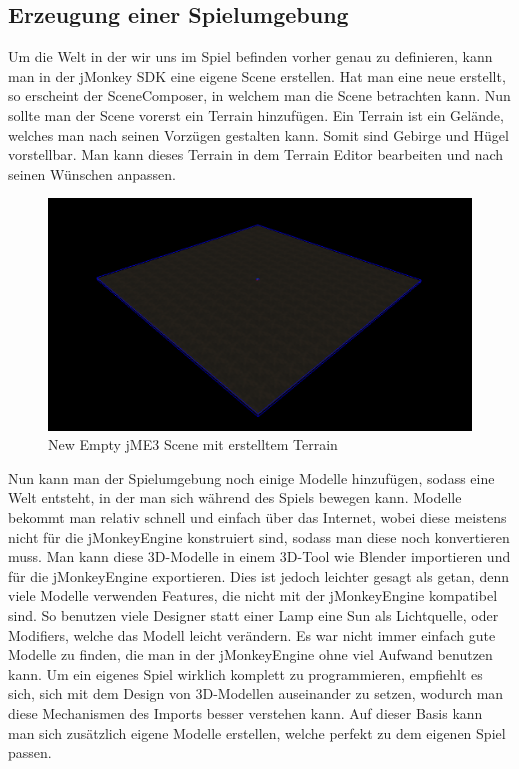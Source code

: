 \subsection{Erzeugung einer Spielumgebung}
Um die Welt in der wir uns im Spiel befinden vorher genau zu definieren, kann man in der jMonkey SDK eine eigene Scene erstellen. Hat man eine neue  erstellt, so erscheint der SceneComposer, in welchem man die Scene betrachten kann. Nun sollte man der Scene vorerst ein Terrain hinzufügen. Ein Terrain ist ein Gelände, welches man nach seinen Vorzügen gestalten kann. Somit sind Gebirge und Hügel vorstellbar. Man kann dieses Terrain in dem Terrain Editor bearbeiten und nach seinen Wünschen anpassen. 
\begin{figure}[h!]
	
	\caption{New Empty jME3 Scene mit erstelltem Terrain}
	
	\includegraphics[width=.8\linewidth]{images/EmptySceneWithTerrain} 
	
\end{figure}
Nun kann man der Spielumgebung noch einige Modelle hinzufügen, sodass eine Welt entsteht, in der man sich während des Spiels bewegen kann. Modelle bekommt man relativ schnell und einfach über das Internet, wobei diese meistens nicht für die jMonkeyEngine konstruiert sind, sodass man diese noch konvertieren muss. Man kann diese 3D-Modelle in einem 3D-Tool wie Blender importieren und für die jMonkeyEngine exportieren. Dies ist jedoch leichter gesagt als getan, denn viele Modelle verwenden Features, die nicht mit der jMonkeyEngine kompatibel sind. So benutzen viele Designer statt einer Lamp eine Sun als Lichtquelle, oder Modifiers, welche das Modell leicht verändern. Es war nicht immer einfach gute Modelle zu finden, die man in der jMonkeyEngine ohne viel Aufwand benutzen kann. Um ein eigenes Spiel wirklich komplett zu programmieren, empfiehlt es sich, sich mit dem Design von 3D-Modellen auseinander zu setzen, wodurch man diese Mechanismen des Imports besser verstehen kann. Auf dieser Basis kann man sich zusätzlich eigene Modelle erstellen, welche perfekt zu dem eigenen Spiel passen. 

